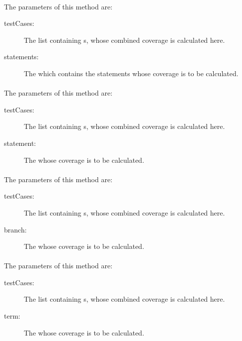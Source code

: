 \paragraph{} \label{Classes:Metrics:CoverageMetric:getCoverage_statements}
The parameters of this method are:
\begin{description}
\item[testCases:] The list containing s, whose combined coverage is calculated here.

\item[statements:] The  which contains the statements whose coverage is to be calculated.

\end{description}

\paragraph{} \label{Classes:Metrics:CoverageMetric:getCoverage_statement}
The parameters of this method are:
\begin{description}
\item[testCases:] The list containing s, whose combined coverage is calculated here.

\item[statement:]  The  whose coverage is to be calculated.

\end{description}

\paragraph{} \label{Classes:Metrics:CoverageMetric:getCoverage_branch}
The parameters of this method are:
\begin{description}
\item[testCases:] The list containing s, whose combined coverage is calculated here.

\item[branch:] The  whose coverage is to be calculated.

\end{description}

\paragraph{} \label{Classes:Metrics:CoverageMetric:getCoverage_term}
The parameters of this method are:
\begin{description}
\item[testCases:] The list containing s, whose combined coverage is calculated here.

\item[term:]  The  whose coverage is to be calculated.

\end{description}

